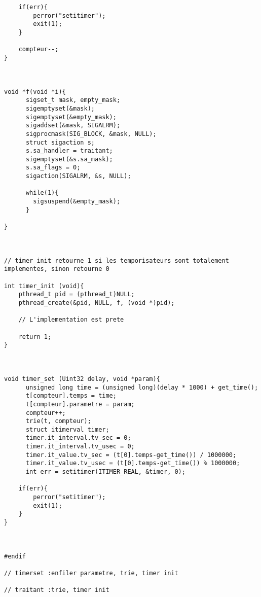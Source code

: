 \documentclass{report}
\begin{document}
\begin{lstlisting}
    if(err){
    	perror("setitimer");
    	exit(1);
  	}
  	
    compteur--;
}



void *f(void *i){
	  sigset_t mask, empty_mask;
	  sigemptyset(&mask);
	  sigemptyset(&empty_mask);
	  sigaddset(&mask, SIGALRM);
	  sigprocmask(SIG_BLOCK, &mask, NULL);
	  struct sigaction s;
	  s.sa_handler = traitant;
	  sigemptyset(&s.sa_mask);
	  s.sa_flags = 0;
	  sigaction(SIGALRM, &s, NULL);
      
      while(1){
    	sigsuspend(&empty_mask);
	  }
      
}



// timer_init retourne 1 si les temporisateurs sont totalement implementes, sinon retourne 0

int timer_init (void){
  	pthread_t pid = (pthread_t)NULL;
  	pthread_create(&pid, NULL, f, (void *)pid);
    
    // L'implementation est prete
    
  	return 1;
}



void timer_set (Uint32 delay, void *param){
	  unsigned long time = (unsigned long)(delay * 1000) + get_time();
	  t[compteur].temps = time;
	  t[compteur].parametre = param;
	  compteur++;
	  trie(t, compteur);
	  struct itimerval timer;
	  timer.it_interval.tv_sec = 0;
	  timer.it_interval.tv_usec = 0;
	  timer.it_value.tv_sec = (t[0].temps-get_time()) / 1000000; 
	  timer.it_value.tv_usec = (t[0].temps-get_time()) % 1000000;  
	  int err = setitimer(ITIMER_REAL, &timer, 0);
  
  	if(err){
    	perror("setitimer");
    	exit(1);
  	}
}



#endif

// timerset :enfiler parametre, trie, timer init

// traitant :trie, timer init
  \end{lstlisting}
\end{document}
